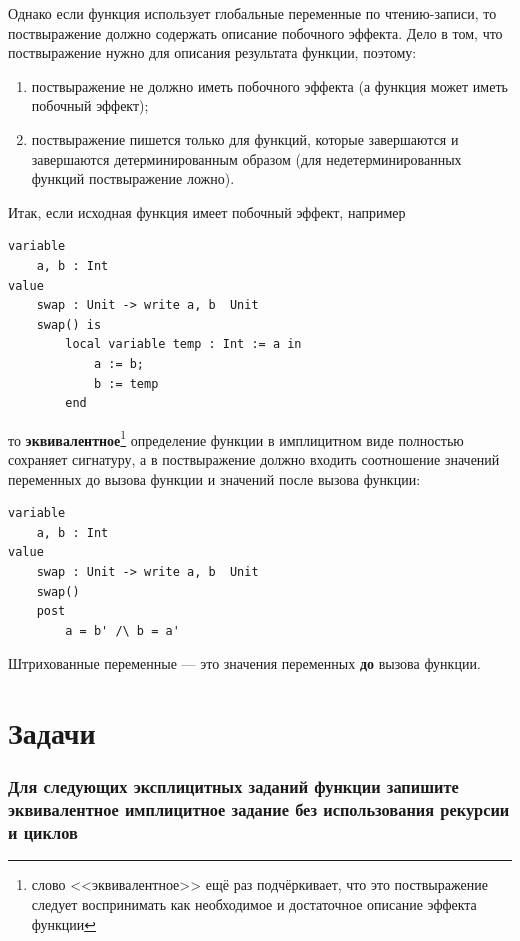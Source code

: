\documentclass[14pt, twoside]{extreport}
\newcounter{problem_type}[chapter]
\newcommand{\head}[1]{\vspace{1cm}\subsubsection*{#1}}
\newcommand{\zhead}[1]{\head{#1} \refstepcounter{problem_type}}
\begin{document}
Однако если функция использует глобальные переменные по чтению-записи, то поствыражение должно содержать описание побочного эффекта. Дело в том, что поствыражение нужно для описания результата функции, поэтому:
\begin{enumerate}
\item поствыражение не должно иметь побочного эффекта (а функция может иметь побочный эффект);
\item поствыражение пишется только для функций, которые завершаются и завершаются детерминированным образом (для недетерминированных функций поствыражение ложно).
\end{enumerate}

Итак, если исходная функция имеет побочный эффект, например
\begin{lstlisting}
variable
	a, b : Int
value
	swap : Unit -> write a, b  Unit
	swap() is
		local variable temp : Int := a in
			a := b;
			b := temp
		end
\end{lstlisting} 
то \textbf{эквивалентное}\footnote{слово <<эквивалентное>> ещё раз подчёркивает, что это поствыражение следует воспринимать как необходимое и достаточное описание эффекта функции} определение функции в имплицитном виде полностью сохраняет сигнатуру, а в поствыражение должно входить соотношение значений переменных до вызова функции и значений после вызова функции:
\begin{lstlisting}
variable
	a, b : Int
value
	swap : Unit -> write a, b  Unit
	swap()
	post
		a = b' /\ b = a'
\end{lstlisting}

Штрихованные переменные --- это значения переменных \textbf{до} вызова функции.



    \section*{Задачи}

    

    

\zhead{Для следующих эксплицитных заданий функции запишите эквивалентное имплицитное задание без использования рекурсии и циклов}

\end{document}
